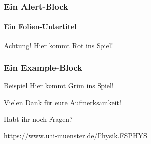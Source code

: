 \documentclass[german, ngerman,tikz]{beamer}
\begin{document}
\begin{frame}
	\frametitle{Ein Alert-Block}
	\framesubtitle{Ein Folien-Untertitel}

	\begin{alertblock}{Achtung!}
		Hier kommt Rot ins Spiel!
	\end{alertblock}
\end{frame}

\begin{frame}
	\frametitle{Ein Example-Block}

	\begin{exampleblock}{Beispiel}
		Hier kommt Grün ins Spiel!
	\end{exampleblock}
\end{frame}

\begin{frame}
	\begin{block}{}
		\centering
		Vielen Dank für eure Aufmerksamkeit!
	\end{block}

	\begin{block}{}
		\centering
		Habt ihr noch Fragen?
	\end{block}

	\begin{center}

		\medskip
		\url{https://www.uni-muenster.de/Physik.FSPHYS}
	\end{center}
\end{frame}
\end{document}
